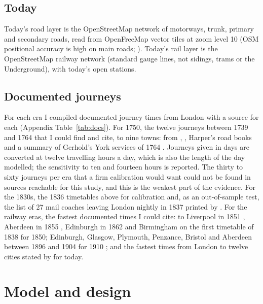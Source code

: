 \documentclass[11pt,a4paper]{article}
\begin{document}
\subsection{Today}
Today's road layer is the OpenStreetMap network of motorways, trunk, primary and secondary roads, read from OpenFreeMap vector tiles at zoom level 10 (OSM positional accuracy is high on main roads; \citealp{haklay2010}). Today's rail layer is the OpenStreetMap railway network (standard gauge lines, not sidings, trams or the Underground), with today's open stations.

\subsection{Documented journeys}
For each era I compiled documented journey times from London with a source for each (Appendix Table~\ref{tab:docs}). For 1750, the twelve journeys between 1739 and 1764 that I could find and cite, to nine towns: from \citet{smiles1867}, \citet{bogart2005}, Harper's road books and a summary of Gerhold's York services of 1764 \citep{gnrsite}. Journeys given in days are converted at twelve travelling hours a day, which is also the length of the day modelled; the sensitivity to ten and fourteen hours is reported. The thirty to sixty journeys per era that a firm calibration would want could not be found in sources reachable for this study, and this is the weakest part of the evidence. For the 1830s, the 1836 timetables above for calibration and, as an out-of-sample test, the list of 27 mail coaches leaving London nightly in 1837 printed by \citet{harper1903}. For the railway eras, the fastest documented times I could cite: to Liverpool in 1851 \citep{sidney1851}, Aberdeen in 1855 \citep{wiki_race}, Edinburgh in 1862 \citep{wiki_fs} and Birmingham on the first timetable of 1838 \citep{tring} for 1850; Edinburgh, Glasgow, Plymouth, Penzance, Bristol and Aberdeen between 1896 and 1904 for 1910 \citep{wiki_fs,harper1903,wiki_cre,wiki_cornishman,wiki_race}; and the fastest times from London to twelve cities stated by \citet{visitlondon} for today.

\section{Model and design}\label{sec:model}
\end{document}
